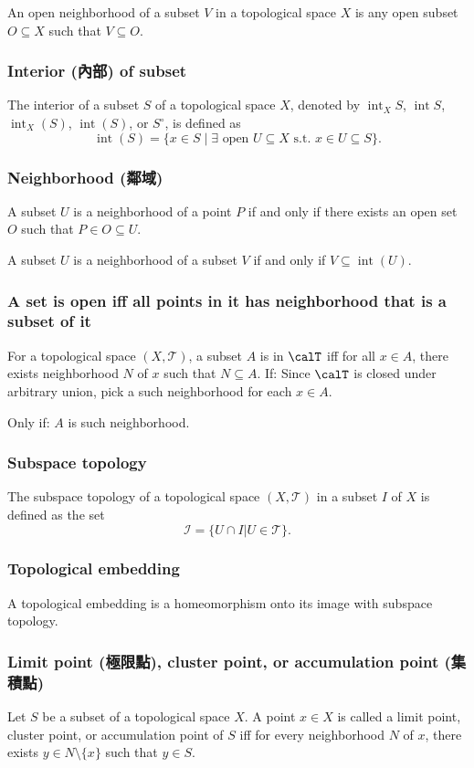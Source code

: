 \documentclass[a4paper,12pt]{article}
\begin{document}
An open neighborhood of a subset $V$ in a topological space $X$ is any open subset $O\subseteq X$ such that $V\subseteq O$.
\subsubsection{Interior (內部) of subset}
The interior of a subset $S$ of a topological space $X$, denoted by $\operatorname{int}_XS$, $\operatorname{int}S$, $\operatorname{int}_X(S)$, $\operatorname{int}(S)$, or $S^{\circ}$, is defined as
\[\operatorname{int}(S) = \{ x \in S \mid \exists \text{\ open\ } U\subseteq X \text{\ s.t.\ } x \in U \subseteq S \}.\]
\subsubsection{Neighborhood (鄰域)}
A subset $U$ is a neighborhood of a point $P$ if and only if there exists an open set $O$ such that $P\in O\subseteq U$.

A subset $U$ is a neighborhood of a subset $V$ if and only if $V\subseteq\operatorname{int}(U)$.
\subsubsection{A set is open iff all points in it has neighborhood that is a subset of it}
For a topological space $(X,\mathcal{T})$, a subset $A$ is in $\calT$ iff for all $x\in A$, there exists neighborhood $N$ of $x$ such that $N\subseteq A$.
\bpr
If: Since $\calT$ is closed under arbitrary union, pick a such neighborhood for each $x\in A$.

Only if: $A$ is such neighborhood.
\epr
\subsubsection{Subspace topology}
The subspace topology of a topological space $(X,\mathcal{T})$ in a subset $I$ of $X$ is defined as the set 
\[\mathcal{I}=\{U\cap I | U\in\mathcal{T}\}.\]
\subsubsection{Topological embedding}
A topological embedding is a homeomorphism onto its image with subspace topology.
\subsubsection{Limit point (極限點), cluster point, or accumulation point (集積點)}
Let $S$ be a subset of a topological space $X$. A point $x\in X$ is called a limit point, cluster point, or accumulation point of $S$ iff for every neighborhood $N$ of $x$, there exists $y\in N\setminus\{x\}$ such that $y\in S$.
\end{document}
